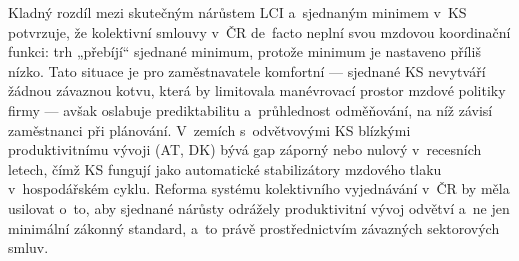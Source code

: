 Kladný rozdíl mezi skutečným nárůstem \ac{LCI} a~sjednaným minimem v~\ac{KS} potvrzuje, že kolektivní smlouvy v~ČR de~facto neplní svou mzdovou koordinační funkci: trh „přebíjí“ sjednané minimum, protože minimum je nastaveno příliš nízko.
Tato situace je pro zaměstnavatele komfortní --- sjednané \ac{KS} nevytváří žádnou závaznou kotvu, která by limitovala manévrovací prostor mzdové politiky firmy --- avšak oslabuje prediktabilitu a~průhlednost odměňování, na níž závisí zaměstnanci při plánování.
V~zemích s~odvětvovými \ac{KS} blízkými produktivitnímu vývoji (AT, DK) bývá gap záporný nebo nulový v~recesních letech, čímž \ac{KS} fungují jako automatické stabilizátory mzdového tlaku v~hospodářském cyklu.
Reforma systému kolektivního vyjednávání v~ČR by měla usilovat o~to, aby sjednané nárůsty odrážely produktivitní vývoj odvětví a~ne jen minimální zákonný standard, a~to právě prostřednictvím závazných sektorových smluv.



